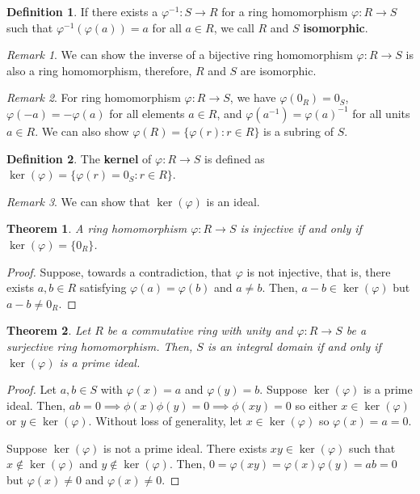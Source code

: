 \documentclass[parskip=half]{scrartcl}  %
\theoremstyle{definition}
\newtheorem{definition}{Definition}[section]
\theoremstyle{plain}
\newtheorem{theorem}{Theorem}[definition]
\theoremstyle{remark}
\newtheorem{remark}{Remark}[definition]
\begin{document}
\begin{definition}
    If there exists a $\varphi^{-1}:S\to R$ for a ring homomorphism
    $\varphi:R\to S$ such that $\varphi^{-1}(\varphi(a))=a$ for all $a\in R$,
    we call $R$ and $S$ \textbf{isomorphic}.
\end{definition}

\begin{remark}
    We can show the inverse of a bijective ring homomorphism $\varphi:R\to S$
    is also a ring homomorphism, therefore, $R$ and $S$ are isomorphic.
\end{remark}

\begin{remark}
    For ring homomorphism $\varphi:R\to S$, we have $\varphi(0_R)=0_S$,
    $\varphi(-a)=-\varphi(a)$ for all elements $a\in R$, and
    $\varphi(a^{-1})=\varphi(a)^{-1}$ for all units $a\in R$.
    We can also show $\varphi(R)=\{\varphi(r):r\in R\}$ is a subring of $S$.
\end{remark}

\begin{definition}
    The \textbf{kernel} of $\varphi:R\to S$ is defined as
    $\ker(\varphi)=\{\varphi(r)=0_S:r\in R\}$.
\end{definition}

\begin{remark}
    We can show that $\ker(\varphi)$ is an ideal.
\end{remark}

\begin{theorem}
    A ring homomorphism $\varphi:R\to S$ is injective if and only if
    $\ker(\varphi)=\{0_R\}$.
\end{theorem}

\begin{proof}
    Suppose, towards a contradiction, that $\varphi$ is not injective, that is,
    there exists $a,b\in R$ satisfying $\varphi(a)=\varphi(b)$ and $a\neq b$.
    Then, $a-b\in\ker(\varphi)$ but $a-b\neq 0_R$.
\end{proof}

\begin{theorem}
    Let $R$ be a commutative ring with unity and $\varphi:R\to S$ be a
    surjective ring homomorphism. Then, $S$ is an integral domain if and only
    if $\ker(\varphi)$ is a prime ideal.
\end{theorem}

\begin{proof}
    Let $a,b\in S$ with $\varphi(x)=a$ and $\varphi(y)=b$.
    Suppose $\ker(\varphi)$ is a prime ideal.
    Then, $ab=0\implies\phi(x)\phi(y)=0\implies\phi(xy)=0$ so either
    $x\in\ker(\varphi)$ or $y\in\ker(\varphi)$.
    Without loss of generality, let $x\in\ker(\varphi)$ so
    $\varphi(x)=a=0$.

    Suppose $\ker(\varphi)$ is not a prime ideal.
    There exists $xy\in\ker(\varphi)$ such that $x\notin\ker(\varphi)$ and
    $y\notin\ker(\varphi)$.
    Then, $0=\varphi(xy)=\varphi(x)\varphi(y)=ab=0$ but $\varphi(x)\neq 0$ and
    $\varphi(x)\neq 0$.
\end{proof}
\end{document}
